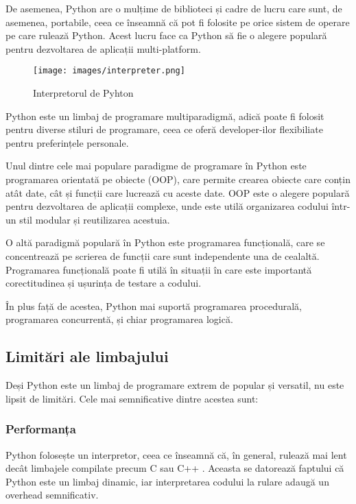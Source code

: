 De asemenea, Python are o mulțime de biblioteci și cadre de lucru care sunt, de asemenea, portabile, ceea ce înseamnă că pot fi folosite pe orice sistem de operare pe care rulează Python. Acest lucru face ca Python să fie o alegere populară pentru dezvoltarea de aplicații multi-platform.

\begin{figure}[ht]
         \centering 
         \texttt{[image: images/interpreter.png]}
         \captionsetup{font=footnotesize}
         \caption{Interpretorul de Pyhton\cite{interpreter}}
\end{figure}

Python este un limbaj de programare multiparadigmă, adică poate fi folosit pentru diverse stiluri de programare, ceea ce oferă developer-ilor flexibiliate pentru preferințele personale. 

Unul dintre cele mai populare paradigme de programare în Python este programarea orientată pe obiecte (OOP), care permite crearea obiecte care conțin atât date, cât și funcții care lucrează cu aceste date. OOP este o alegere populară pentru dezvoltarea de aplicații complexe, unde este utilă organizarea codului într-un stil modular și reutilizarea acestuia. 

O altă paradigmă populară în Python este programarea funcțională, care se concentrează pe scrierea de funcții care sunt independente una de cealaltă. Programarea funcțională poate fi utilă în situații în care este importantă corectitudinea și ușurința de testare a codului.

În plus față de acestea, Python mai suportă programarea procedurală, programarea concurrentă, și chiar programarea logică. 

\subsection{Limitări ale limbajului}

Deși Python este un limbaj de programare extrem de popular și versatil, nu este lipsit de limitări. Cele mai semnificative dintre acestea sunt:

\subsubsection{Performanța}

Python folosește un interpretor, ceea ce înseamnă că, în general, rulează mai lent decât limbajele compilate precum C sau C++ . Aceasta se datorează faptului că Python este un limbaj dinamic, iar interpretarea codului la rulare adaugă un overhead semnificativ. 

